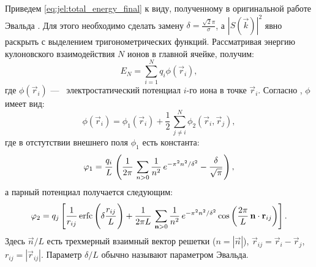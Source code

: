 Приведем \eqref{eq:jel:total_energy_final} к виду, полученному в оригинальной работе Эвальда \cite{ewald:summation_original}.
Для этого необходимо сделать замену $\delta = \frac{\sqrt{2} \pi}{\sigma}$, а $| S (\vec{k}) |^2$ явно раскрыть с выделением тригонометрических функций.
Рассматривая энергию кулоновского взаимодействия $N$ ионов в главной ячейке, получим:
\begin{equation}
    \label{eq:mean:E_coloumb_main-cell}
    E_N = \sum\limits_{i=1}^{N} q_i \phi (\vec{r}_{i}),
\end{equation}
где $\phi (\vec{r}_{i})$ ---~ электростатический потенциал $i$-го иона в точке $\vec{r}_{i}$.
Согласно \cite{ewald:summation_original}, $\phi$ имеет вид:
\begin{equation}
    \label{eq:mean:phi_as_sum}
    \phi (\vec{r}_{i}) = \phi_1 (\vec{r}_{i}) + \frac{1}{2}\, \sum\limits_{j \neq i}^{N} \phi_2 (\vec{r}_{i}, \vec{r}_{j}),
\end{equation}
где в отстутствии внешнего поля $\phi_1$ есть константа:
\begin{equation}
    \label{eq:mean:phi_1}
    \phi_1 = \cfrac{q_{i}}{L}\, \left( \frac{1}{2\pi}\, \sum\limits_{n > 0}^{} \frac{1}{n^2}\, e^{-\pi^2 n^2 / \delta^2} - \cfrac{\delta}{\sqrt{\pi}}\, \right),
\end{equation}
а парный потенциал получается следующим:
\begin{equation}
    \label{eq:mean:phi_2}
    \phi_2 = q_{j} \left[ \frac{1}{r_{ij}}\, \mathrm{erfc} \left( \delta \cfrac{r_{ij}}{L}\, \right) + \frac{1}{2\pi L}\, \sum\limits_{\vec{n} > 0}^{} \frac{1}{n^2}\, e^{-\pi^2 n^2 / \delta^2} \cos \left( \frac{2\pi}{L}\, \vec{n} \cdot \vec{r}_{ij} \right) \right].
\end{equation}
Здесь $\vec{n} / L$ есть трехмерный взаимный вектор решетки ($n = | \vec{n} |$), $\vec{r}_{ij} = \vec{r}_{i} - \vec{r}_{j}$, $r_{ij} = |\vec{r}_{ij}|$.
Параметр $\delta / L$ обычно называют параметром Эвальда.


